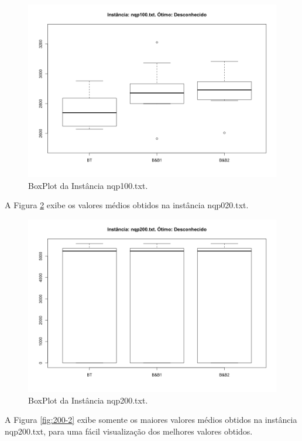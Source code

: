 \documentclass[12pt]{article}
\begin{document}
	\begin{figure}[H]
		\centering
		\includegraphics[width=0.9\linewidth]{img/100-2}
		\caption{BoxPlot da Instância nqp100.txt.}
		\label{fig:100-2}
	\end{figure}

	A Figura \ref{fig:200} exibe os valores médios obtidos na instância nqp020.txt.

	\begin{figure}[H]
		\centering
		\includegraphics[width=0.9\linewidth]{img/200}
		\caption{BoxPlot da Instância nqp200.txt.}
		\label{fig:200}
	\end{figure}

	A Figura \ref{fig:200-2} exibe somente os maiores valores médios obtidos na instância nqp200.txt, para uma fácil visualização dos melhores valores obtidos.
\end{document}
